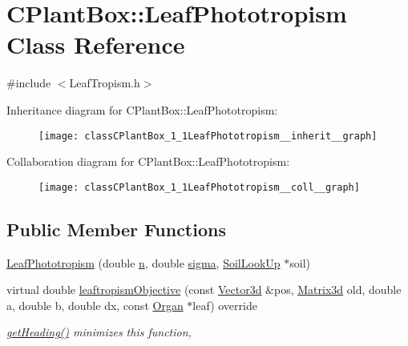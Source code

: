\hypertarget{classCPlantBox_1_1LeafPhototropism}{}\section{C\+Plant\+Box\+:\+:Leaf\+Phototropism Class Reference}
\label{classCPlantBox_1_1LeafPhototropism}


{\ttfamily \#include $<$Leaf\+Tropism.\+h$>$}



Inheritance diagram for C\+Plant\+Box\+:\+:Leaf\+Phototropism\+:\nopagebreak
\begin{figure}[H]
\begin{center}
\leavevmode
\texttt{[image: classCPlantBox\_1\_1LeafPhototropism\_\_inherit\_\_graph]}
\end{center}
\end{figure}


Collaboration diagram for C\+Plant\+Box\+:\+:Leaf\+Phototropism\+:\nopagebreak
\begin{figure}[H]
\begin{center}
\leavevmode
\texttt{[image: classCPlantBox\_1\_1LeafPhototropism\_\_coll\_\_graph]}
\end{center}
\end{figure}
\subsection*{Public Member Functions}
\begin{DoxyCompactItemize}
\item 
\hyperlink{classCPlantBox_1_1LeafPhototropism_ad92daedd811b83ab7b6e8901dd9970dc}{Leaf\+Phototropism} (double \hyperlink{classCPlantBox_1_1LeafTropismFunction_a21d8d756f8b9f6015b546def33b01c89}{n}, double \hyperlink{classCPlantBox_1_1LeafTropismFunction_a82a3dc11056a65501bc4535749c304b6}{sigma}, \hyperlink{classCPlantBox_1_1SoilLookUp}{Soil\+Look\+Up} $\ast$soil)
\item 
virtual double \hyperlink{classCPlantBox_1_1LeafPhototropism_a9b9cee624adc576c2cc44b1b27b2ef0c}{leaftropism\+Objective} (const \hyperlink{classCPlantBox_1_1Vector3d}{Vector3d} \&pos, \hyperlink{classCPlantBox_1_1Matrix3d}{Matrix3d} old, double a, double b, double dx, const \hyperlink{classCPlantBox_1_1Organ}{Organ} $\ast$leaf) override
\begin{DoxyCompactList}\small\item\em \hyperlink{classCPlantBox_1_1LeafTropismFunction_a1440868221a834474e34e3a503a74572}{get\+Heading()} minimizes this function, \end{DoxyCompactList}\end{DoxyCompactItemize}
